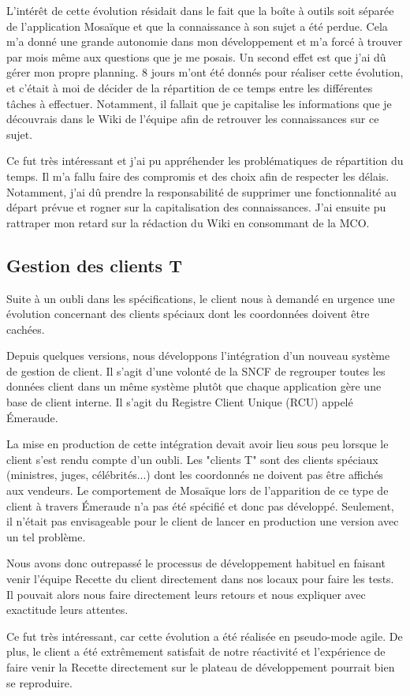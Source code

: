     L'intérêt de cette évolution résidait dans le fait que la boîte à outils soit séparée de l'application Mosaïque et que la connaissance à son sujet a été perdue. Cela m'a donné une grande autonomie dans mon développement et m'a forcé à trouver par mois même aux questions que je me posais. Un second effet est que j'ai dû gérer mon propre planning. 8 jours m'ont été donnés pour réaliser cette évolution, et c'était à moi de décider de la répartition de ce temps entre les différentes tâches à effectuer. Notamment, il fallait que je capitalise les informations que je découvrais dans le Wiki de l’équipe afin de retrouver les connaissances sur ce sujet. 
    
    Ce fut très intéressant et j'ai pu appréhender les problématiques de répartition du temps. Il m'a fallu faire des compromis et des choix afin de respecter les délais. Notamment, j'ai dû prendre la responsabilité de supprimer une fonctionnalité au départ prévue et rogner sur la capitalisation des connaissances. J'ai ensuite pu rattraper mon retard sur la rédaction du Wiki en consommant de la MCO.
    
\subsection{Gestion des clients T}
    
    Suite à un oubli dans les spécifications, le client nous à demandé en urgence une évolution concernant des clients spéciaux dont les coordonnées doivent être cachées.
    
    Depuis quelques versions, nous développons l'intégration d'un nouveau système de gestion de client. Il s'agit d'une volonté de la SNCF de regrouper toutes les données client dans un même système plutôt que chaque application gère une base de client interne. Il s'agit du Registre Client Unique (RCU) appelé Émeraude.
    
    La mise en production de cette intégration devait avoir lieu sous peu lorsque le client s'est rendu compte d'un oubli. Les "clients T" sont des clients spéciaux (ministres, juges, célébrités...) dont les coordonnés ne doivent pas être affichés aux vendeurs. Le comportement de Mosaïque lors de l'apparition de ce type de client à travers Émeraude n'a pas été spécifié et donc pas développé. Seulement, il n'était pas envisageable pour le client de lancer en production une version avec un tel problème.
    
    Nous avons donc outrepassé le processus de développement habituel en faisant venir l'équipe Recette du client directement dans nos locaux pour faire les tests. Il pouvait alors nous faire directement leurs retours et nous expliquer avec exactitude leurs attentes.
    
    Ce fut très intéressant, car cette évolution a été réalisée en pseudo-mode agile. De plus, le client a été extrêmement satisfait de notre réactivité et l'expérience de faire venir la Recette directement sur le plateau de développement pourrait bien se reproduire.